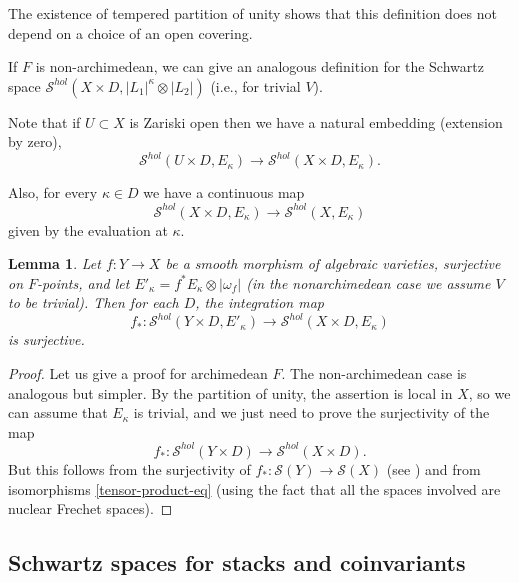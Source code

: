 \documentclass[12pt,reqno]{amsart}
\DeclareMathOperator\C{\mathbb C}
\newtheorem{lemma}[theorem]{Lemma}
\theoremstyle{definition}
\theoremstyle{remark}
\numberwithin{equation}{section}
\newcommand{\ot}{\otimes}
\renewcommand{\SS}{{\mathcal S}}
\newcommand{\HH}{{\mathcal H}}
\newcommand{\sub}{\subset}
\newcommand{\om}{\omega}
\begin{document}
The existence of tempered partition of unity shows that this definition does not depend on a choice of an open covering.

If $F$ is non-archimedean, we can give
an analogous definition for the Schwartz space $\SS^{hol}(X\times D,|L_1|^{\kappa}\ot |L_2|)$ (i.e., for trivial $V$).

Note that if $U\sub X$ is Zariski open then we have a natural embedding (extension by zero),
$$\SS^{hol}(U\times D,E_{\kappa})\to \SS^{hol}(X\times D,E_{\kappa}).$$

Also, for every $\kappa\in D$ we have a continuous map
$$\SS^{hol}(X\times D,E_{\kappa})\to \SS^{hol}(X,E_{\kappa})$$
given by the evaluation at $\kappa$.



\begin{lemma}\label{surj-int-lem}
Let $f:Y\to X$ be a smooth morphism of algebraic varieties, surjective on $F$-points, and let $E'_{\kappa}=f^*E_{\kappa}\ot |\om_f|$ (in the nonarchimedean case
we assume $V$ to be trivial).
Then for each $D$, the integration map
$$f_*:\SS^{hol}(Y\times D,E'_{\kappa})\to \SS^{hol}(X\times D,E_{\kappa})$$
is surjective.
\end{lemma}

\begin{proof}
Let us give a proof for archimedean $F$. The non-archimedean case is analogous but simpler. 
By the partition of unity, the assertion is local in $X$, so we can assume that $E_{\kappa}$ is trivial, and we just need to prove the surjectivity
of the map
$$f_*:\SS^{hol}(Y\times D)\to \SS^{hol}(X\times D).$$
But this follows from the surjectivity of $f_*:\SS(Y)\to \SS(X)$ (see \cite[Thm.\ B.2.4]{AGS}) and from isomorphisms \eqref{tensor-product-eq}
(using the fact that all the spaces involved are nuclear Frechet spaces). 
\end{proof}

\subsection{Schwartz spaces for stacks and coinvariants}\label{schw-stacks-sec}
\end{document}
